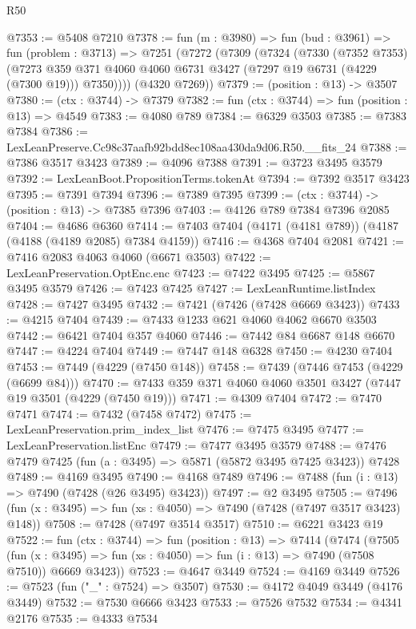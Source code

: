 \begin{lexlean}{R50}
\begin{coremodule}
@7353 := @5408 @7210
@7378 := fun (m : @3980) =>
  fun (bud : @3961) =>
  fun (problem : @3713) =>
  @7251
    (@7272
      (@7309
        (@7324
          (@7330
            (@7352 @7353)
            (@7273 @359 @371 @4060 @4060 @6731 @3427 (@7297 @19 @6731 (@4229 (@7300 @19))) @7350))))
      (@4320 @7269))
@7379 := (position : @13) -> @3507
@7380 := (ctx : @3744) -> @7379
@7382 := fun (ctx : @3744) => fun (position : @13) => @4549
@7383 := @4080 @789
@7384 := @6329 @3503
@7385 := @7383 @7384
@7386 := LexLeanPreserve.Cc98c37aafb92bdd8ec108aa430da9d06.R50.__fits_24
@7388 := @7386 @3517 @3423
@7389 := @4096 @7388
@7391 := @3723 @3495 @3579
@7392 := LexLeanBoot.PropositionTerms.tokenAt
@7394 := @7392 @3517 @3423
@7395 := @7391 @7394
@7396 := @7389 @7395
@7399 := (ctx : @3744) -> (position : @13) -> @7385 @7396
@7403 := @4126 @789 @7384 @7396 @2085
@7404 := @4686 @6360
@7414 := @7403 @7404 (@4171 (@4181 @789)) (@4187 (@4188 (@4189 @2085) @7384 @4159))
@7416 := @4368 @7404 @2081
@7421 := @7416 @2083 @4063 @4060 (@6671 @3503)
@7422 := LexLeanPreservation.OptEnc.enc
@7423 := @7422 @3495
@7425 := @5867 @3495 @3579
@7426 := @7423 @7425
@7427 := LexLeanRuntime.listIndex
@7428 := @7427 @3495
@7432 := @7421 (@7426 (@7428 @6669 @3423))
@7433 := @4215 @7404
@7439 := @7433 @1233 @621 @4060 @4062 @6670 @3503
@7442 := @6421 @7404 @357 @4060
@7446 := @7442 @84 @6687 @148 @6670
@7447 := @4224 @7404
@7449 := @7447 @148 @6328
@7450 := @4230 @7404
@7453 := @7449 (@4229 (@7450 @148))
@7458 := @7439 (@7446 @7453 (@4229 (@6699 @84)))
@7470 := @7433 @359 @371 @4060 @4060 @3501 @3427 (@7447 @19 @3501 (@4229 (@7450 @19)))
@7471 := @4309 @7404
@7472 := @7470 @7471
@7474 := @7432 (@7458 @7472)
@7475 := LexLeanPreservation.prim_index_list
@7476 := @7475 @3495
@7477 := LexLeanPreservation.listEnc
@7479 := @7477 @3495 @3579
@7488 := @7476 @7479 @7425 (fun (a : @3495) => @5871 (@5872 @3495 @7425 @3423)) @7428
@7489 := @4169 @3495
@7490 := @4168 @7489
@7496 := @7488 (fun (i : @13) => @7490 (@7428 (@26 @3495) @3423))
@7497 := @2 @3495
@7505 := @7496 (fun (x : @3495) => fun (xs : @4050) => @7490 (@7428 (@7497 @3517 @3423) @148))
@7508 := @7428 (@7497 @3514 @3517)
@7510 := @6221 @3423 @19
@7522 := fun (ctx : @3744) =>
  fun (position : @13) =>
  @7414
    (@7474
      (@7505
        (fun (x : @3495) => fun (xs : @4050) => fun (i : @13) => @7490 (@7508 @7510))
        @6669
        @3423))
@7523 := @4647 @3449
@7524 := @4169 @3449
@7526 := @7523 (fun ("_" : @7524) => @3507)
@7530 := @4172 @4049 @3449 (@4176 @3449)
@7532 := @7530 @6666 @3423
@7533 := @7526 @7532
@7534 := @4341 @2176
@7535 := @4333 @7534

\end{coremodule}
\end{lexlean}
